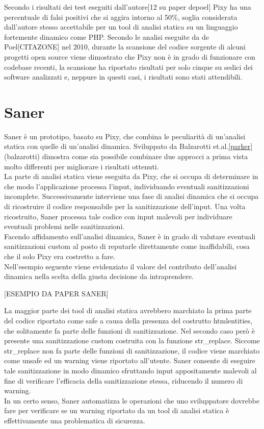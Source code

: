 Secondo i risultati dei test eseguiti dall'autore[12 su paper depoel] Pixy ha una percentuale di falsi positivi che si aggira intorno al 50\%, soglia considerata dall'autore stesso accettabile per un tool di analisi statica su un linguaggio fortemente dinamico come PHP. Secondo le analisi eseguite da de Poel[CITAZONE] nel 2010, durante la scansione del codice sorgente di alcuni progetti open source viene dimostrato che Pixy non è in grado di funzionare con codebase recenti, la scansione ha riportato risultati per solo cinque su sedici dei software analizzati e, neppure in questi casi, i risultati sono stati attendibili.
		
\section{Saner}
Saner è un prototipo, basato su Pixy, che combina le peculiarità di un'analisi statica con quelle di un'analisi dinamica.
Sviluppato da Balzarotti et.al.\ref{parker}(balzarotti) dimostra come sia possibile combinare due approcci a prima vista molto differenti per migliorare i risultati ottenuti.\\
La parte di analisi statica viene eseguita da Pixy, che si occupa di determinare in che modo l'applicazione processa l'input, individuando eventuali sanitizzazioni incomplete. Successivamente interviene una fase di analisi dinamica che si occupa di ricostruire il codice responsabile per la sanitizzazione dell'input. Una volta ricostruito, Saner processa tale codice con input malevoli per individuare eventuali problemi nelle sanitizzazioni.\\
Facendo affidamento sull'analisi dinamica, Saner è in grado di valutare eventuali sanitizzazioni custom al posto di reputarle direttamente come inaffidabili, cosa che il solo Pixy era costretto a fare.\\
Nell'esempio seguente viene evidenziato il valore del contributo dell'analisi dinamica nella scelta della giusta decisione da intraprendere.

[ESEMPIO DA PAPER SANER]

La maggior parte dei tool di analisi statica avrebbero marchiato la prima parte del codice riportato come safe a causa della presenza del costrutto htmlentities, che solitamente fa parte delle funzioni di sanitizzazione. Nel secondo caso però è presente una sanitizzazione custom costruita con la funzione str\_replace. Siccome str\_replace non fa parte delle funzioni di sanitizzazione, il codice viene marchiato come unsafe ed un warning viene riportato all'utente. Saner consente di eseguire tale sanitizzazione in modo dinamico sfruttando input appositamente malevoli al fine di verificare l'efficacia della sanitizzazione stessa, riducendo il numero di warning.\\
In un certo senso, Saner automatizza le operazioni che uno sviluppatore dovrebbe fare per verificare se un warning riportato da un tool di analisi statica è effettivamente una problematica di sicurezza.


